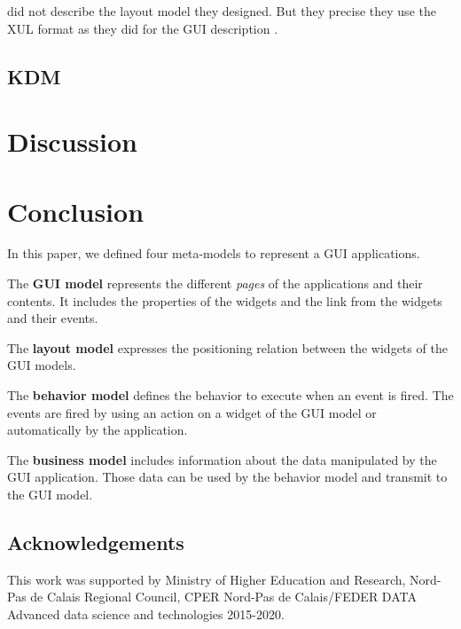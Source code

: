 \documentclass[conference]{IEEEtran}
\begin{document}
\citet{samir2007swing2script} did not describe the layout model they designed.
But they precise they use the XUL format as they did for the GUI description .


\subsection{KDM}
\label{sec:kdm}


\section{Discussion}
\label{sec:discussion}



\section{Conclusion}
\label{sec:conclusion}


In this paper, we defined four meta-models to represent a GUI applications.

The \textbf{GUI model} represents the different \textit{pages} of the applications and their contents.
It includes the properties of the widgets and the link from the widgets and their events.

The \textbf{layout model} expresses the positioning relation between the widgets of the GUI models.

The \textbf{behavior model} defines the behavior to execute when
    an event is fired.
The events are fired by using an action on a widget of the GUI model or
    automatically by the application.

The \textbf{business model} includes information about the data manipulated
    by the GUI application.
Those data can be used by the behavior model and transmit to the
    GUI model.

\subsection*{Acknowledgements} 
This work was supported by Ministry of Higher Education and Research, Nord-Pas de Calais Regional Council, CPER Nord-Pas de Calais/FEDER DATA Advanced data science and technologies 2015-2020.

%


\end{document}
